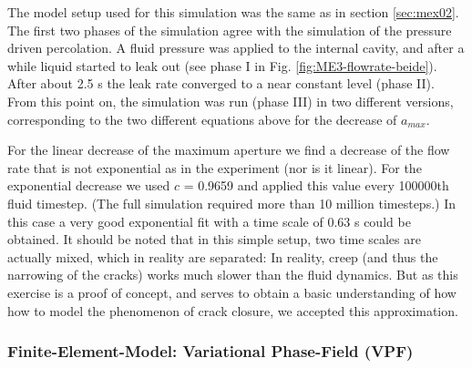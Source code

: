 The model setup used for this simulation was the same as in section \ref{sec:mex02}. The first two phases of the simulation agree with the simulation of the pressure driven percolation. A fluid pressure was applied to the internal cavity, and after a while liquid started to leak out (see phase I in Fig. \ref{fig:ME3-flowrate-beide}). After about 2.5 s the leak rate converged to a near constant level (phase II). From this point on, the simulation was run (phase III) in two different versions, corresponding to the two different equations above for the decrease of $a_{max}$. 

For the linear decrease of the maximum aperture we find a decrease of the flow rate that is not exponential as in the experiment (nor is it linear). For the exponential decrease we used $c$ = 0.9659 and applied this value every 100000th fluid timestep. (The full simulation required more than 10 million timesteps.) In this case a very good exponential fit with a time scale of 0.63 s could be obtained. It should be noted that in this simple setup, two time scales are actually mixed, which in reality are separated: In reality, creep (and thus the narrowing of the cracks) works much slower than the fluid dynamics. But as this exercise is a proof of concept, and serves to obtain a basic understanding of how how to model the phenomenon of crack closure, we accepted this approximation. 

\subsubsection*{Finite-Element-Model: Variational Phase-Field (VPF)}

